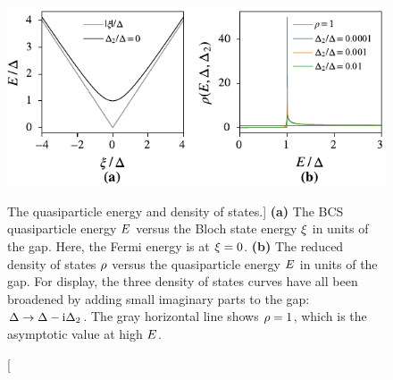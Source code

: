 \begin{figure}[htb]
\centering
\includegraphics[width=\textwidth]{theory/quasiparticle_energy_and_density_of_states.pdf}
\caption
[The quasiparticle energy and density of states.]
{
\textbf{(a)}
The BCS quasiparticle energy $E$ versus the Bloch state energy $\xi$ in units of the gap.
Here, the Fermi energy is at $\xi = 0$.
\textbf{(b)}
The reduced density of states $\rho$ versus the quasiparticle energy $E$ in units of the gap.
For display, the three density of states curves have all been broadened by adding small imaginary parts to the gap:
$\Delta \rightarrow \Delta - \mathrm{i} \Delta_2$.
The gray horizontal line shows $\rho = 1$, which is the asymptotic value at high $E$.
}
\label{fig:quasiparticle_energy_and_density_of_states}
\end{figure}

